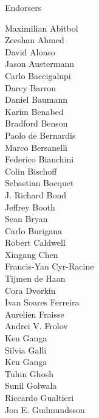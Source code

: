 \documentclass[PICOReport.tex]{subfiles}
\begin{document}
\Large { \centerline {Endorsers}}
%
\footnotesize {
\begin{multicols}{4}  
Maximilian Abitbol              \\
Zeeshan Ahmed                   \\
David Alonso                    \\
Jason Austermann                \\
Carlo Baccigalupi               \\
Darcy Barron                    \\
Daniel Baumann                  \\
Karim Benabed                   \\
Bradford Benson                 \\
Paolo de Bernardis              \\
Marco Bersanelli                \\
Federico Bianchini              \\
Colin Bischoff                  \\
Sebastian Bocquet               \\
J. Richard Bond                 \\
Jeffrey Booth                   \\
Sean Bryan                      \\
Carlo Burigana                  \\
Robert Caldwell                 \\
Xingang Chen                    \\
Francis-Yan Cyr-Racine          \\
Tijmen de Haan                  \\
Cora Dvorkin                    \\
Ivan Soares Ferreira            \\
Aurelien Fraisse                \\
Andrei V. Frolov                \\
Ken Ganga                       \\
Silvia Galli                    \\
Ken Ganga                       \\
Tuhin Ghosh                     \\
Sunil Golwala                   \\
Riccardo Gualtieri              \\
Jon E. Gudmundsson              \\

\end{multicols}}
\end{document}
